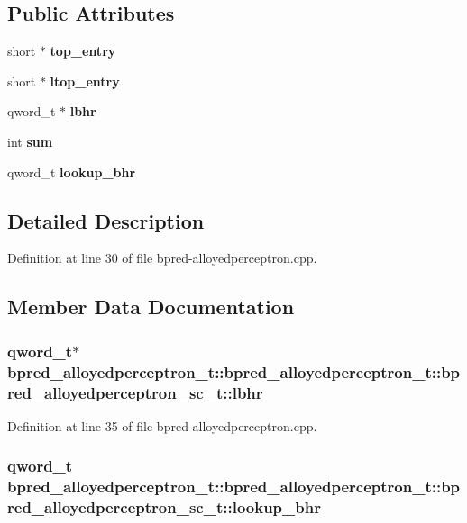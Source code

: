 \subsection*{Public Attributes}
\begin{CompactItemize}
\item 
short $\ast$ {\bf top\_\-entry}
\item 
short $\ast$ {\bf ltop\_\-entry}
\item 
qword\_\-t $\ast$ {\bf lbhr}
\item 
int {\bf sum}
\item 
qword\_\-t {\bf lookup\_\-bhr}
\end{CompactItemize}


\subsection{Detailed Description}


Definition at line 30 of file bpred-alloyedperceptron.cpp.

\subsection{Member Data Documentation}
\subsubsection[{lbhr}]{\setlength{\rightskip}{0pt plus 5cm}qword\_\-t$\ast$ bpred\_\-alloyedperceptron\_\-t::bpred\_\-alloyedperceptron\_\-t::bpred\_\-alloyedperceptron\_\-sc\_\-t::lbhr}\label{classbpred__alloyedperceptron__t_1_1bpred__alloyedperceptron__sc__t_ecd3c598ab2cedc3528a7c386e72d168}




Definition at line 35 of file bpred-alloyedperceptron.cpp.
\subsubsection[{lookup\_\-bhr}]{\setlength{\rightskip}{0pt plus 5cm}qword\_\-t bpred\_\-alloyedperceptron\_\-t::bpred\_\-alloyedperceptron\_\-t::bpred\_\-alloyedperceptron\_\-sc\_\-t::lookup\_\-bhr}\label{classbpred__alloyedperceptron__t_1_1bpred__alloyedperceptron__sc__t_a0d1b2266be493067fb77ff1731af3ba}




